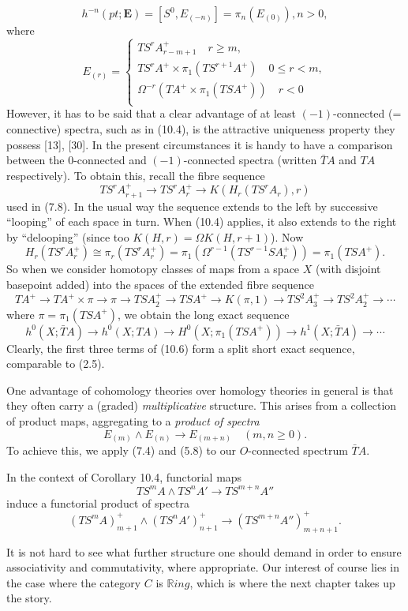 \[h^{-n}(pt;\mathbf{E}) = [S^0, E_{(-n)}] = \pi_n(E_{(0)}), n>0,\]
where
\begin{equation}
E_{(r)}=
  \begin{cases}
TS^rA^+_{r-m+1} \quad r\geqslant m, \\
TS^rA^+ \times \pi_1(TS^{r+1}A^+) \quad 0\leqslant r<m,\\
\Omega^{-r}(TA^+ \times\pi_1(TSA^+))  \quad r<0 \\
\end{cases}
\end{equation}
However, it has to be said that a clear advantage of at least $(-1)$-connected (= connective) spectra, such as in (10.4), is the attractive uniqueness property they possess [13], [30]. In the present circumstances it is handy to have a comparison between the $0$-connected and $(-1)$-connected spectra (written $\bar{T}A$ and $TA$ respectively). To obtain this, recall the fibre sequence
\[TS^rA^+_{r+1} \longrightarrow TS^rA_r^+\longrightarrow K(H_r(TS^rA_r),r)\]
used in (7.8). In the usual way the sequence extends to the left by successive ``looping'' of each space in turn. When (10.4) applies, it also extends to the right by ``delooping'' (since too $K(H,r) = \Omega K(H,r+1)$). Now
\[H_r(TS^rA_r^+) \cong \pi_r(TS^rA_r^+) = \pi_1 (\Omega^{r-1}(TS^{r-1}SA_r^+)) = \pi_1(TSA^+).\]
So when we consider homotopy classes of maps from a space $X$ (with disjoint basepoint added) into the spaces of the extended fibre sequence
\[TA^+ \longrightarrow TA^+ \times \pi \longrightarrow \pi \longrightarrow TSA_2^+ \longrightarrow TSA^+ \longrightarrow K(\pi, 1) \longrightarrow TS^2A_3^+ \longrightarrow TS^2A^+_2 \longrightarrow \cdots \]
where $\pi = \pi_1(TSA^+)$, we obtain the long exact sequence
\begin{equation}
  h^0(X; \bar{T}A) \longrightarrow h^0(X; TA)\longrightarrow  H^0(X; \pi_1(TSA^+))\longrightarrow  h^1(X; \bar{T}A)\longrightarrow  \cdots
\end{equation}
Clearly, the first three terms of (10.6) form a split short exact sequence, comparable to (2.5).

One advantage of cohomology theories over homology theories in general is that they often carry a (graded) {\em multiplicative} structure. This arises from a collection of product maps, aggregating to a {\em product of spectra}
\[E_{(m)}\wedge E_{(n)}\longrightarrow E_{(m+n)} \quad (m,n\geqslant 0).\]
To achieve this, we apply (7.4) and (5.8) to our $O$-connected spectrum $\bar{T}A$.
\begin{corollary}
  In the context of Corollary 10.4, functorial maps 
  \[TS^mA \wedge TS^nA'\longrightarrow TS^{m+n}A''\]
   induce a functorial product of spectra
   \[(TS^mA)^+_{m+1} \wedge (TS^nA')^+_{n+1}\longrightarrow (TS^{m+n}A'')^+_{m+n+1}.\]
\end{corollary}
It is not hard to see what further structure one should demand in order to ensure associativity and commutativity, where appropriate. Our interest of course lies in the case where the category $C$ is $\mathbb{R}ing$, which is where the next chapter takes up the story.

